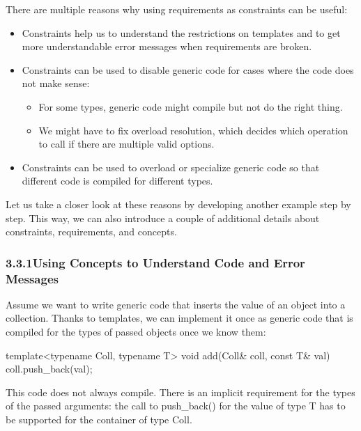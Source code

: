 

There are multiple reasons why using requirements as constraints can be useful:

\begin{itemize}
\item
Constraints help us to understand the restrictions on templates and to get more understandable error messages when requirements are broken.

\item
Constraints can be used to disable generic code for cases where the code does not make sense:
\begin{itemize}
\item
For some types, generic code might compile but not do the right thing.

\item
We might have to fix overload resolution, which decides which operation to call if there are multiple valid options.
\end{itemize}

\item
Constraints can be used to overload or specialize generic code so that different code is compiled for different types.
\end{itemize}

Let us take a closer look at these reasons by developing another example step by step. This way, we can also introduce a couple of additional details about constraints, requirements, and concepts.


\subsubsection*{ 3.3.1\hspace{0.2cm}Using Concepts to Understand Code and Error Messages}

Assume we want to write generic code that inserts the value of an object into a collection. Thanks to templates, we can implement it once as generic code that is compiled for the types of passed objects once we know them:

\begin{cpp}
template<typename Coll, typename T>
void add(Coll& coll, const T& val)
{
	coll.push_back(val);
}
\end{cpp}

This code does not always compile. There is an implicit requirement for the types of the passed arguments: the call to push\_back() for the value of type T has to be supported for the container of type Coll.

